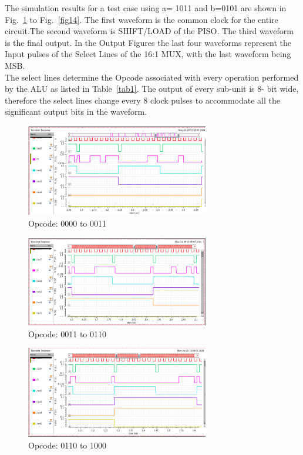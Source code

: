 \documentclass[conference]{IEEEtran}
\begin{document}
The simulation results for a test case using  a=  1011 and b=0101 are shown in Fig.~\ref{fig10} to Fig.~\ref{fig14}. The first waveform is the common clock for the entire circuit.The second waveform is SHIFT/LOAD of the PISO. The third waveform is the final output. In the Output Figures the last four waveforms represent the Input pulses of the Select Lines of the 16:1 MUX, with the last waveform being MSB.\\
The select lines determine the Opcode associated with every operation performed by the ALU as listed in Table~\ref{tab1}. The output of every sub-unit is 8- bit wide, therefore the select lines change every 8 clock pulses to accommodate all the significant output bits in the waveform.
\begin{figure}[H]
\centerline{\includegraphics[width=8cm,keepaspectratio,]{"Opcode_0000_0011.png"}}
\caption{Opcode: 0000 to 0011 }
\label{fig10}
\end{figure}
\begin{figure}[H]
\centerline{\includegraphics[width=8cm,keepaspectratio,]{"Opcode_0011_0110.png"}}
\caption{Opcode: 0011 to 0110}
\label{fig11}
\end{figure}
\begin{figure}[H]
\centerline{\includegraphics[width=8cm,keepaspectratio,]{"Opcode_0110_1000.png"}}
\caption{Opcode: 0110 to 1000}
\label{fig12}
\end{figure} 
\end{document}
